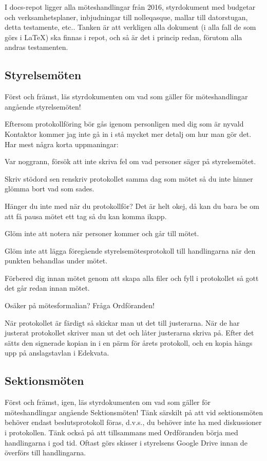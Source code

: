 \documentclass[10pt]{article}
\begin{document}
I docs-repot ligger alla möteshandlingar från 2016, styrdokument med budgetar och verksamhetsplaner, inbjudningar till nolleqasque, mallar till datorstugan, detta testamente, etc.. Tanken är att verkligen alla dokument (i alla fall de som görs i \LaTeX) ska finnas i repot, och så är det i princip redan, förutom alla andras testamenten.

\subsection{Styrelsemöten}
Först och främst, läs styrdokumenten om vad som gäller för möteshandlingar angående styrelsemöten!

Eftersom protokollföring bör gås igenom personligen med dig som är nyvald Kontaktor kommer jag inte gå in i stå mycket mer detalj om hur man gör det. Har mest några korta uppmaningar:
\begin{tightdashlist}
    \item Var noggrann, försök att inte skriva fel om vad personer säger på styrelsemötet.
    \item Skriv stödord sen renskriv protokollet samma dag som mötet så du inte hinner glömma bort vad som sades.
    \item Hänger du inte med när du protokollför? Det är helt okej, då kan du bara be om att få pausa mötet ett tag så du kan komma ikapp.
    \item Glöm inte att notera när personer kommer och går till mötet.
    \item Glöm inte att lägga föregående styrelsemötesprotokoll till handlingarna när den punkten behandlas under mötet.
    \item Förbered dig innan mötet genom att skapa alla filer och fyll i protokollet så gott det går redan innan mötet.
    \item Osäker på mötesformalian? Fråga Ordföranden!
\end{tightdashlist}

När protokollet är färdigt så skickar man ut det till justerarna. När de har justerat protokollet skriver man ut det och låter justerarna skriva på. Efter det sätts den signerade kopian in i en pärm för årets protokoll, och en kopia hängs upp på anslagstavlan i Edekvata.

\subsection{Sektionsmöten}
Först och främst, igen, läs styrdokumenten om vad som gäller för möteshandlingar angående Sektionsmöten! Tänk särskilt på att vid sektionsmöten behöver endast beslutsprotokoll föras, d.v.s., du behöver inte ha med diskussioner i protokollen. Tänk också på att tillsammans med Ordföranden börja med handlingarna i god tid. Oftast görs skisser i styrelsens Google Drive innan de överförs till handlingarna.
\end{document}
